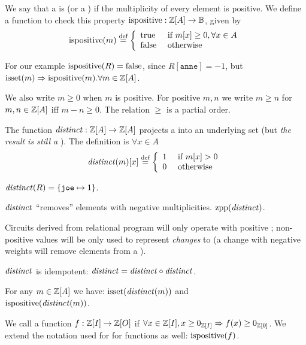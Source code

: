 \begin{definition}
We say that a \zr is  (or a ) if the multiplicity of every element is
positive. We define a function to check this property
$\mbox{ispositive} : \mathbb{Z}[A] \rightarrow \mathbb{B}$, given by
$$\mbox{ispositive}(m) \stackrel{\textrm{\scriptsize def}}{=} \left\{
\begin{array}{ll}
  \mbox{true} & \mbox{ if } m[x] \geq 0, \forall x \in A \\
  \mbox{false} & \mbox{ otherwise}
\end{array}
\right.$$
\end{definition}
For our example $\mbox{ispositive}(R) = \mbox{false}$, since $R[\texttt{anne}] = -1$,
but $\mbox{isset}(m) \Rightarrow \mbox{ispositive}(m). \forall m \in \mathbb{Z}[A]$.

We also write $m \geq 0$ when $m$ is
positive.  For positive $m, n$ we write $m \geq n$ for $m, n
\in \mathbb{Z}[A]$ iff $m - n \geq 0$.  The relation $\geq$ is a partial order.

\begin{definition}
The function $\mathit{distinct}: \mathbb{Z}[A] \rightarrow \mathbb{Z}[A]$
projects a \zr into an underlying set (but \emph{the result is
  still a \zr}).  The definition is $\forall x \in A$
$$\mathit{distinct}(m)[x] \stackrel{\textrm{\scriptsize def}}{=} \left\{
\begin{array}{ll}
  1 & \mbox{ if } m[x] > 0 \\
  0 & \mbox{ otherwise}
\end{array}
\right.
$$
\end{definition}
$\mathit{distinct}(R) = \{ \texttt{joe} \mapsto 1 \}$.

$\mathit{distinct}$ ``removes'' elements with negative multiplicities.  $\mbox{zpp}(\mathit{distinct})$.

Circuits derived from relational program will only operate with positive \zrs; 
non-positive values will be only used to represent \emph{changes} to \zrs 
(a change with negative weights will remove elements from a \zr).

\begin{proposition}
$\mathit{distinct}$ is idempotent: $\mathit{distinct} = \mathit{distinct} \circ \mathit{distinct}$.  
\end{proposition}

\begin{proposition}
For any $m \in \mathbb{Z}[A]$ we have: $\mbox{isset}(\mathit{distinct}(m))$ and \\
$\mbox{ispositive}(\mathit{distinct}(m))$.  
\end{proposition}

We call a function $f : \mathbb{Z}[I] \rightarrow \mathbb{Z}[O]$  if
$\forall x \in \mathbb{Z}[I], x \geq 0_{\mathbb{Z}[I]} \Rightarrow f(x) \geq 0_{\mathbb{Z}[0]}$.  
We extend the notation used for \zrs for functions as well: $\mbox{ispositive}(f)$.

